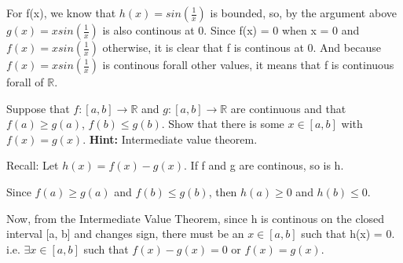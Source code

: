 \documentclass[answers]{exam}
\theoremstyle{remark}
\theoremstyle{definition}
\newcommand{\RR}{\mathbb{R}}
\begin{document}
\begin{questions}
\begin{solution}
For f(x), we know that $h(x) = sin(\frac{1}{x})$ is bounded, so,
by the argument above $g(x) = xsin(\frac{1}{x})$ is also continous at 0.
Since f(x) = 0 when x = 0 and $f(x) = xsin(\frac{1}{x})$ otherwise,
it is clear that f is continous at 0. And because $f(x) = xsin(\frac{1}{x})$
is continous forall other values, it means that f is continuous forall of $\RR$.


\end{solution}

\question[4] Suppose that $f: [a,b] \to \RR$ and $g: [a,b] \to \RR$ are continuous and that $f(a) \ge g(a)$, $f(b) \le g(b)$. Show that there is some $x \in [a,b]$ with $f(x)=g(x)$. \textbf{Hint:} Intermediate value theorem.
\begin{solution}

Recall:
Let $h(x) = f(x) - g(x)$. If f and g are continous, so is h.

Since $f(a) \geq g(a)$ and $f(b) \leq g(b)$, then
$h(a) \geq 0$ and $h(b) \leq 0$.

Now, from the Intermediate Value Theorem, since h is continous on the closed
interval [a, b] and changes sign, there must be an $x \in [a, b]$
such that h(x) = 0. i.e. $\exists x \in [a, b]$ such that
$f(x) - g(x) = 0$ or $f(x) = g(x)$.

\end{solution}

\question
{}
\end{questions}
\end{document}

